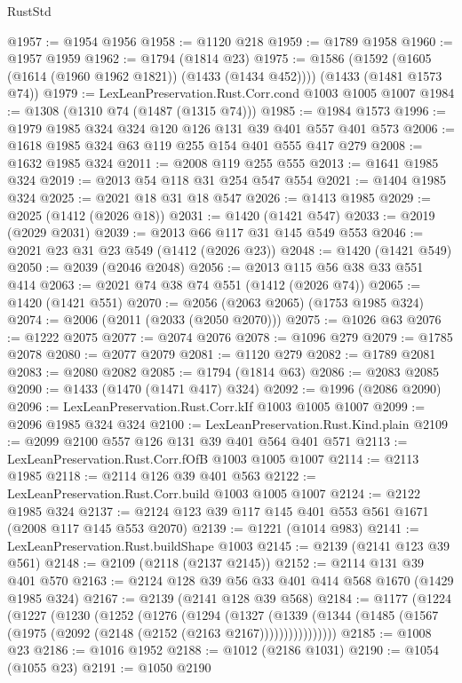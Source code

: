 \begin{lexlean}{RustStd}
\begin{coremodule}
@1957 := @1954 @1956
@1958 := @1120 @218
@1959 := @1789 @1958
@1960 := @1957 @1959
@1962 := @1794 (@1814 @23)
@1975 := @1586
    (@1592 (@1605 (@1614 (@1960 @1962 @1821)) (@1433 (@1434 @452))))
    (@1433 (@1481 @1573 @74))
@1979 := LexLeanPreservation.Rust.Corr.cond @1003 @1005 @1007
@1984 := @1308 (@1310 @74 (@1487 (@1315 @74)))
@1985 := @1984 @1573
@1996 := @1979 @1985 @324 @324 @120 @126 @131 @39 @401 @557 @401 @573
@2006 := @1618 @1985 @324 @63 @119 @255 @154 @401 @555 @417 @279
@2008 := @1632 @1985 @324
@2011 := @2008 @119 @255 @555
@2013 := @1641 @1985 @324
@2019 := @2013 @54 @118 @31 @254 @547 @554
@2021 := @1404 @1985 @324
@2025 := @2021 @18 @31 @18 @547
@2026 := @1413 @1985
@2029 := @2025 (@1412 (@2026 @18))
@2031 := @1420 (@1421 @547)
@2033 := @2019 (@2029 @2031)
@2039 := @2013 @66 @117 @31 @145 @549 @553
@2046 := @2021 @23 @31 @23 @549 (@1412 (@2026 @23))
@2048 := @1420 (@1421 @549)
@2050 := @2039 (@2046 @2048)
@2056 := @2013 @115 @56 @38 @33 @551 @414
@2063 := @2021 @74 @38 @74 @551 (@1412 (@2026 @74))
@2065 := @1420 (@1421 @551)
@2070 := @2056 (@2063 @2065) (@1753 @1985 @324)
@2074 := @2006 (@2011 (@2033 (@2050 @2070)))
@2075 := @1026 @63
@2076 := @1222 @2075
@2077 := @2074 @2076
@2078 := @1096 @279
@2079 := @1785 @2078
@2080 := @2077 @2079
@2081 := @1120 @279
@2082 := @1789 @2081
@2083 := @2080 @2082
@2085 := @1794 (@1814 @63)
@2086 := @2083 @2085
@2090 := @1433 (@1470 (@1471 @417) @324)
@2092 := @1996 (@2086 @2090)
@2096 := LexLeanPreservation.Rust.Corr.kIf @1003 @1005 @1007
@2099 := @2096 @1985 @324 @324
@2100 := LexLeanPreservation.Rust.Kind.plain
@2109 := @2099 @2100 @557 @126 @131 @39 @401 @564 @401 @571
@2113 := LexLeanPreservation.Rust.Corr.fOfB @1003 @1005 @1007
@2114 := @2113 @1985
@2118 := @2114 @126 @39 @401 @563
@2122 := LexLeanPreservation.Rust.Corr.build @1003 @1005 @1007
@2124 := @2122 @1985 @324
@2137 := @2124 @123 @39 @117 @145 @401 @553 @561 @1671 (@2008 @117 @145 @553 @2070)
@2139 := @1221 (@1014 @983)
@2141 := LexLeanPreservation.Rust.buildShape @1003
@2145 := @2139 (@2141 @123 @39 @561)
@2148 := @2109 (@2118 (@2137 @2145))
@2152 := @2114 @131 @39 @401 @570
@2163 := @2124 @128 @39 @56 @33 @401 @414 @568 @1670 (@1429 @1985 @324)
@2167 := @2139 (@2141 @128 @39 @568)
@2184 := @1177
    (@1224
      (@1227
        (@1230
          (@1252
            (@1276
              (@1294
                (@1327
                  (@1339
                    (@1344 (@1485 (@1567 (@1975 (@2092 (@2148 (@2152 (@2163 @2167))))))))))))))))
@2185 := @1008 @23
@2186 := @1016 @1952
@2188 := @1012 (@2186 @1031)
@2190 := @1054 (@1055 @23)
@2191 := @1050 @2190

\end{coremodule}
\end{lexlean}
